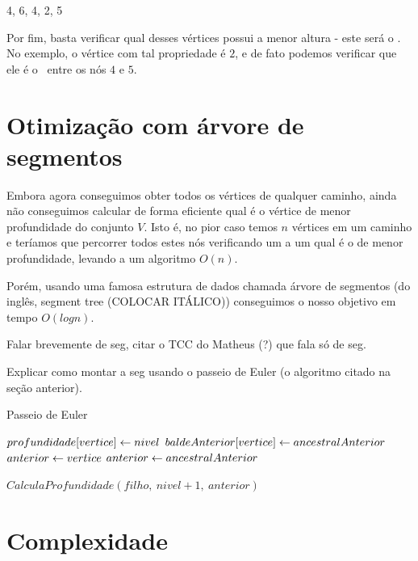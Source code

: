 \vspace{0.3cm}

\begin{center}
    4, 6, 4, 2, 5    
\end{center}

Por fim, basta verificar qual desses vértices possui a menor altura - este será o \LCA. No exemplo, o vértice com tal propriedade é $2$, e de fato podemos verificar que ele é o \LCA\ entre os nós $4$ e $5$.

\section{Otimização com árvore de segmentos}

Embora agora conseguimos obter todos os vértices de qualquer caminho, ainda não conseguimos calcular de forma eficiente qual é o vértice de menor profundidade do conjunto $V$. Isto é, no pior caso temos $n$ vértices em um caminho e teríamos que percorrer todos estes nós verificando um a um qual é o de menor profundidade, levando a um algoritmo $O(n)$.

Porém, usando uma famosa estrutura de dados chamada árvore de segmentos (do inglês, segment tree (COLOCAR ITÁLICO)) conseguimos o nosso objetivo em tempo $O(log n)$.

Falar brevemente de seg, citar o TCC do Matheus (?) que fala só de seg.

Explicar como montar a seg usando o passeio de Euler (o algoritmo citado na seção anterior).

\begin{algorithm}[H]
\caption{Passeio de Euler}
\begin{algorithmic}[1]
    \State $profundidade[vertice] \leftarrow nivel$
    \State $baldeAnterior[vertice] \leftarrow ancestralAnterior$
        \State $anterior \leftarrow vertice$
    \Else
        \State $anterior \leftarrow ancestralAnterior$
    \EndIf
        
        \State $CalculaProfundidade(filho,\ nivel+1,\ anterior)$
    \EndFor
\EndFunction
\end{algorithmic}
\end{algorithm}


\section{Complexidade}

